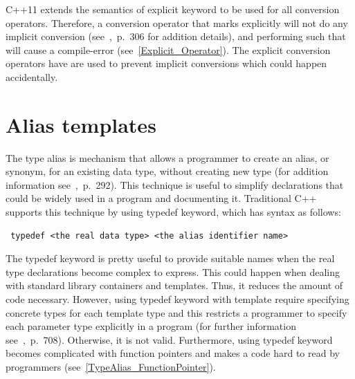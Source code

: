 \documentclass[11pt]{report}
\begin{document}
C++11 extends the semantics of explicit keyword to be used for all conversion operators. Therefore, a conversion operator that marks explicitly will not do any implicit conversion (see~\cite{Stroustrup:2012:Cpp11},~p.~306 for addition details), and performing such that will cause a compile-error (see~\ref{Explicit_Operator}). The explicit conversion operators have are used to prevent implicit conversions which could happen accidentally.

\section{Alias templates}
\label{section: Alias templates}
The type alias is mechanism that allows a programmer to create an alias, or synonym, for an existing data type, without creating new type (for addition information see~\cite{Gregorie:professionalcpp},~p.~292). This technique is useful to simplify declarations that could be widely used in a program and documenting it. Traditional C++ supports this technique by using typedef keyword, which has syntax as follows:
\begin{lstlisting}
 typedef <the real data type> <the alias identifier name>
\end{lstlisting}

The typedef keyword is pretty useful to provide suitable names when the real type declarations become complex to express. This could happen when dealing with standard library containers and templates. Thus, it reduces the amount of code necessary. However, using typedef keyword with template require specifying concrete types for each template type and this restricts a programmer to specify each parameter type explicitly in a program (for further information see~\cite{Gregorie:professionalcpp},~p.~708). Otherwise, it is not valid. Furthermore, using typedef keyword becomes complicated with function pointers and makes a code hard to read by programmers (see~\ref{TypeAlias_FunctionPointer}).
\end{document}
